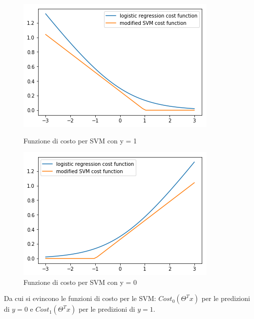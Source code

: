 \begin{figure}[!htb]
   \begin{minipage}{0.48\textwidth}
     \centering
     \includegraphics[width=.7\linewidth]{img/costFunSVMy1.png}
     \caption{Funzione di costo per SVM con y = 1}\label{Fig:SVMCosty1}
   \end{minipage}\hfill
   \begin{minipage}{0.48\textwidth}
     \centering
     \includegraphics[width=.7\linewidth]{img/costFunSVMy0.png}
     \caption{Funzione di costo per SVM con y = 0}\label{Fig:SVMCosty0}
   \end{minipage}
\end{figure}
Da cui si evincono le funzioni di costo per le SVM: $Cost_0(\Theta^Tx)$ per le predizioni di $y=0$ e $Cost_1(\Theta^Tx)$ per le predizioni di $y=1$.
